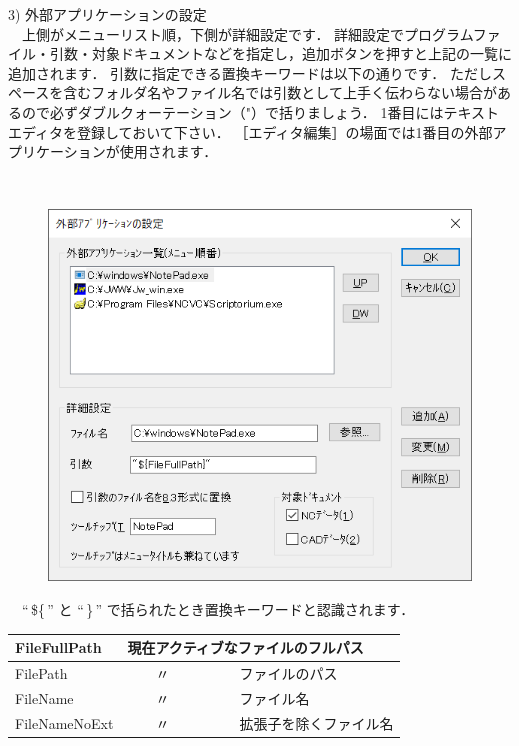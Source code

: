 \begin{minipage}[t]{0.38\textwidth}
3) 外部アプリケーションの設定\label{sec:app}\\
　上側がメニューリスト順，下側が詳細設定です．
詳細設定でプログラムファイル・引数・対象ドキュメントなどを指定し，追加ボタンを押すと上記の一覧に追加されます．
引数に指定できる置換キーワードは以下の通りです．
ただしスペースを含むフォルダ名やファイル名では引数として上手く伝わらない場合があるので必ずダブルクォーテーション（"）で括りましょう．
1番目にはテキストエディタを登録しておいて下さい．
［エディタ編集］の場面では1番目の外部アプリケーションが使用されます．
\end{minipage}
\begin{minipage}[t]{0.02\textwidth}
　
\end{minipage}
\begin{minipage}[t]{0.6\textwidth}
\vspace*{-2zh}
\begin{figure}[H]
\centering
\includegraphics[width=\textwidth]{No6/fig/app.png}
\label{fig:app.png}
\end{figure}
\end{minipage}

\vspace*{2zh}
　``\,\$\{\,'' と ``\,\}\,'' で括られたとき置換キーワードと認識されます．
\begin{table}[H]
\centering
\begin{tabular}{|p{3cm}|p{10cm}|}
\hline
FileFullPath & 現在アクティブなファイルのフルパス \\ \hline
FilePath     & 　　〃　　　　　ファイルのパス \\ \hline
FileName     & 　　〃　　　　　ファイル名 \\ \hline
FileNameNoExt& 　　〃　　　　　拡張子を除くファイル名 \\ \hline
\end{tabular}
\end{table}

